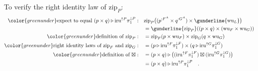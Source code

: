 To verify the right identity law of $\text{zip}_{P}$:
\begin{align*}
{\color{greenunder}\text{expect to equal }(p\times q)\triangleright\text{iru}^{\uparrow P}\pi_{1}^{\downarrow P}:}\quad & \text{zip}_{P}\big((p^{:F^{A}}\times q^{:G^{A}})\times\gunderline{\text{wu}_{L}}\big)\\
 & =\gunderline{\text{zip}_{P}}((p\times q)\times(\text{wu}_{F}\times\text{wu}_{G}))\\
{\color{greenunder}\text{definition of }\text{zip}_{P}:}\quad & =\text{zip}_{F}(p\times\text{wu}_{F})\times\text{zip}_{G}(q\times\text{wu}_{G})\\
{\color{greenunder}\text{right identity laws of }\text{zip}_{F}\text{ and }\text{zip}_{G}:}\quad & =(p\triangleright\text{iru}^{\uparrow F}\pi_{1}^{\downarrow F})\times(q\triangleright\text{iru}^{\uparrow G}\pi_{1}^{\downarrow G})\\
{\color{greenunder}\text{definition of }\boxtimes:}\quad & =(p\times q)\triangleright\big((\text{iru}^{\uparrow F}\pi_{1}^{\downarrow F})\boxtimes(\text{iru}^{\uparrow G}\pi_{1}^{\downarrow G})\big)\\
 & =(p\times q)\triangleright\text{iru}^{\uparrow P}\pi_{1}^{\downarrow P}\quad.
\end{align*}

